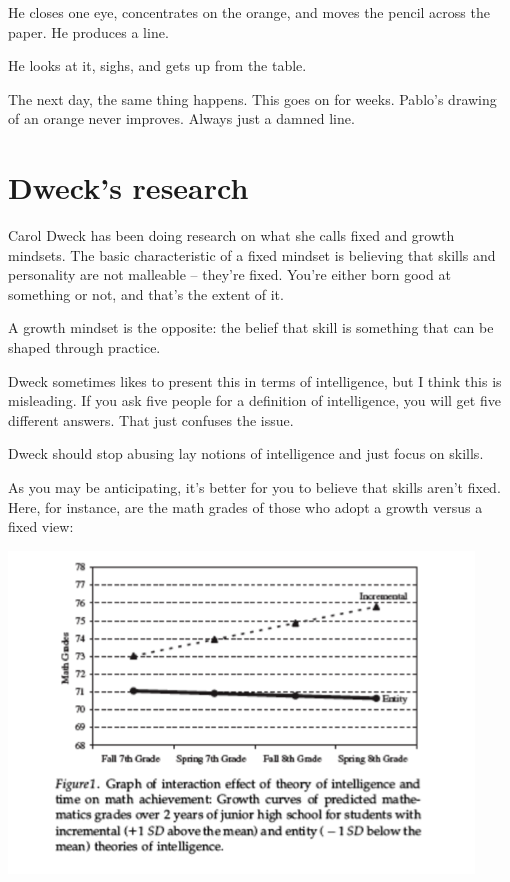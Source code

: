 He closes one eye, concentrates on the orange, and moves the pencil across the
paper. He produces a line.

He looks at it, sighs, and gets up from the table.

The next day, the same thing happens. This goes on for weeks. Pablo's drawing of
an orange never improves. Always just a damned line.

\section{Dweck's research}

Carol Dweck has been doing research on what she calls fixed and growth
mindsets. The basic characteristic of a fixed mindset is believing that skills
and personality are not malleable -- they're fixed. You're either born good at
something or not, and that's the extent of it.

A growth mindset is the opposite: the belief that skill is something that can be
shaped through practice.

Dweck sometimes likes to present this in terms of intelligence, but I think this
is misleading. If you ask five people for a definition of intelligence, you will
get five different answers. That just confuses the issue.

Dweck should stop abusing lay notions of intelligence and just focus on skills.

As you may be anticipating, it's better for you to believe that skills aren't
fixed. Here, for instance, are the math grades of those who adopt a growth
versus a fixed view:

\includegraphics[width=\textwidth]{graphics/fixed-vs-growth-math-dweck}

